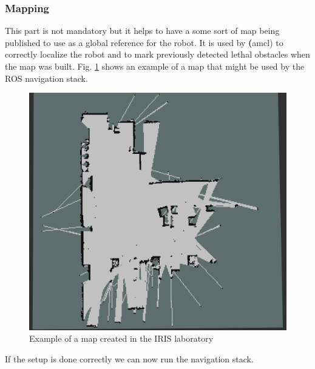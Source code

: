 \documentclass[12pt]{article}
\begin{document}
\subsubsection{Mapping}
This part is not mandatory but it helps to have a some sort of map being published to use as a global reference for the robot. It is used by \textbf(amcl) to correctly localize the robot and to mark previously detected lethal obstacles when the map was built. Fig. \ref{fig:map} shows an example of a map that might be used by the ROS navigation stack.
\begin{figure}[!htb]
    \centering
    \includegraphics[scale=0.2]{map.png}
    \caption{Example of a map created in the IRIS laboratory}
    \label{fig:map}
\end{figure}


If the setup is done correctly we can now run the navigation stack.
\end{document}
